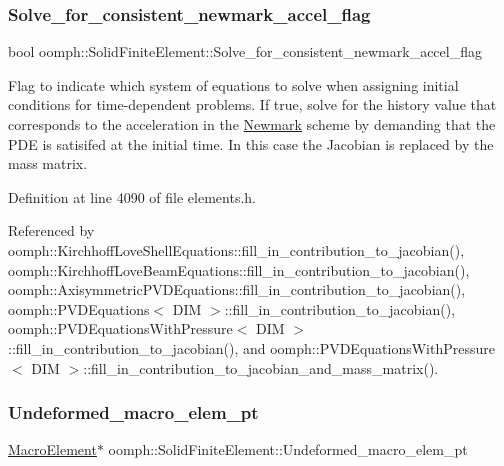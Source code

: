 \subsubsection{\texorpdfstring{Solve\+\_\+for\+\_\+consistent\+\_\+newmark\+\_\+accel\+\_\+flag}{Solve\_for\_consistent\_newmark\_accel\_flag}}
{\footnotesize\ttfamily bool oomph\+::\+Solid\+Finite\+Element\+::\+Solve\+\_\+for\+\_\+consistent\+\_\+newmark\+\_\+accel\+\_\+flag\hspace{0.3cm}{\ttfamily [protected]}}



Flag to indicate which system of equations to solve when assigning initial conditions for time-\/dependent problems. If true, solve for the history value that corresponds to the acceleration in the \hyperlink{classoomph_1_1Newmark}{Newmark} scheme by demanding that the P\+DE is satisifed at the initial time. In this case the Jacobian is replaced by the mass matrix. 



Definition at line 4090 of file elements.\+h.



Referenced by oomph\+::\+Kirchhoff\+Love\+Shell\+Equations\+::fill\+\_\+in\+\_\+contribution\+\_\+to\+\_\+jacobian(), oomph\+::\+Kirchhoff\+Love\+Beam\+Equations\+::fill\+\_\+in\+\_\+contribution\+\_\+to\+\_\+jacobian(), oomph\+::\+Axisymmetric\+P\+V\+D\+Equations\+::fill\+\_\+in\+\_\+contribution\+\_\+to\+\_\+jacobian(), oomph\+::\+P\+V\+D\+Equations$<$ D\+I\+M $>$\+::fill\+\_\+in\+\_\+contribution\+\_\+to\+\_\+jacobian(), oomph\+::\+P\+V\+D\+Equations\+With\+Pressure$<$ D\+I\+M $>$\+::fill\+\_\+in\+\_\+contribution\+\_\+to\+\_\+jacobian(), and oomph\+::\+P\+V\+D\+Equations\+With\+Pressure$<$ D\+I\+M $>$\+::fill\+\_\+in\+\_\+contribution\+\_\+to\+\_\+jacobian\+\_\+and\+\_\+mass\+\_\+matrix().

\mbox{\label{classoomph_1_1SolidFiniteElement_a582281cb3abb1b0d120a2f3310e051f3}} 
\subsubsection{\texorpdfstring{Undeformed\+\_\+macro\+\_\+elem\+\_\+pt}{Undeformed\_macro\_elem\_pt}}
{\footnotesize\ttfamily \hyperlink{classoomph_1_1MacroElement}{Macro\+Element}$\ast$ oomph\+::\+Solid\+Finite\+Element\+::\+Undeformed\+\_\+macro\+\_\+elem\+\_\+pt\hspace{0.3cm}{\ttfamily [protected]}}



